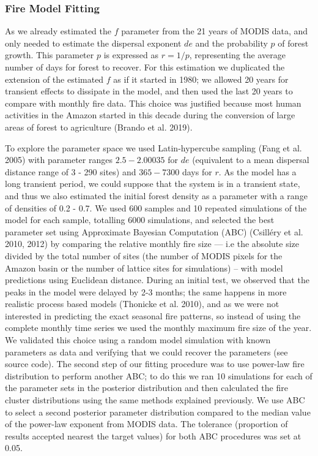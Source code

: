 \documentclass[
]{article}
\begin{document}
\subsubsection{Fire Model Fitting}\label{fire-model-fitting}

As we already estimated the \(f\) parameter from the 21 years of MODIS
data, and only needed to estimate the dispersal exponent \(de\) and the
probability \(p\) of forest growth. This parameter \(p\) is expressed as
\(r=1/p\), representing the average number of days for forest to
recover. For this estimation we duplicated the extension of the
estimated \(f\) as if it started in 1980; we allowed 20 years for
transient effects to dissipate in the model, and then used the last 20
years to compare with monthly fire data. This choice was justified
because most human activities in the Amazon started in this decade
during the conversion of large areas of forest to agriculture (Brando et
al. 2019).

To explore the parameter space we used Latin-hypercube sampling (Fang et
al. 2005) with parameter ranges \(2.5 - 2.00035\) for \(de\) (equivalent
to a mean dispersal distance range of 3 - 290 sites) and \(365 - 7300\)
days for \(r\). As the model has a long transient period, we could
suppose that the system is in a transient state, and thus we also
estimated the initial forest density as a parameter with a range of
densities of 0.2 - 0.7. We used 600 samples and 10 repeated simulations
of the model for each sample, totalling 6000 simulations, and selected
the best parameter set using Approximate Bayesian Computation (ABC)
(Csilléry et al. 2010, 2012) by comparing the relative monthly fire size
--- i.e the absolute size divided by the total number of sites (the
number of MODIS pixels for the Amazon basin or the number of lattice
sites for simulations) -- with model predictions using Euclidean
distance. During an initial test, we observed that the peaks in the
model were delayed by 2-3 months; the same happens in more realistic
process based models (Thonicke et al. 2010), and as we were not
interested in predicting the exact seasonal fire patterns, so instead of
using the complete monthly time series we used the monthly maximum fire
size of the year. We validated this choice using a random model
simulation with known parameters as data and verifying that we could
recover the parameters (see source code). The second step of our fitting
procedure was to use power-law fire distribution to perform another ABC;
to do this we ran 10 simulations for each of the parameter sets in the
posterior distribution and then calculated the fire cluster
distributions using the same methods explained previously. We use ABC to
select a second posterior parameter distribution compared to the median
value of the power-law exponent from MODIS data. The tolerance
(proportion of results accepted nearest the target values) for both ABC
procedures was set at 0.05.
\end{document}
